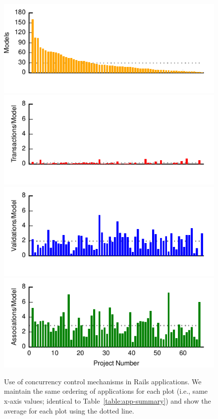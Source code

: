 \begin{figure}
  \newcommand{\skipht}{\\[-1em]}
\includegraphics[width=.75\columnwidth]{figs/models-single-bar.pdf}\skipht
\includegraphics[width=.75\columnwidth]{figs/transactions-single-bar.pdf}\skipht
\includegraphics[width=.75\columnwidth]{figs/validations-single-bar.pdf}\skipht
\includegraphics[width=.75\columnwidth]{figs/associations-single-bar.pdf}\\\vspace{.5em}
\caption{Use of concurrency control mechanisms in Rails
  applications. We maintain the same ordering of applications for each
  plot (i.e., same x-axis values; identical to
  Table~\ref{table:app-summary}) and show the average for each plot
  using the dotted line.}
\label{fig:usages}
\end{figure}



